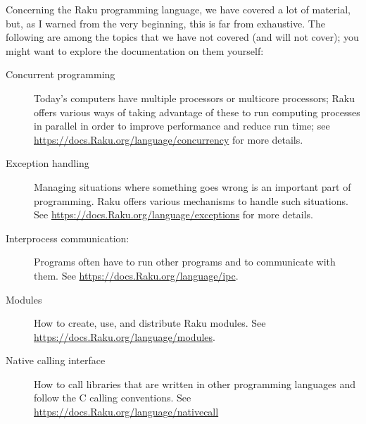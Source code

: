 Concerning the Raku programming language, we have covered a lot of 
material, but, as I warned from the very beginning, 
this is far from exhaustive. The following are among 
the topics that we have not covered (and will not cover); 
you might want to explore the documentation on them 
yourself:

\begin{description}
\item[Concurrent programming] Today's computers have 
multiple processors or multicore processors; Raku 
offers various ways of taking advantage of these to 
run computing processes in parallel in order to 
improve performance and reduce run time; see 
\url{https://docs.Raku.org/language/concurrency} 
for more details.

\item[Exception handling] Managing situations where 
something goes wrong is an important part of 
programming. Raku offers various mechanisms to 
handle such situations. See \url{https://docs.Raku.org/language/exceptions} 
for more details.

\item[Interprocess communication:] Programs often have to 
run other programs and to communicate with them. See 
\url{https://docs.Raku.org/language/ipc}.

\item[Modules] How to create, use, and distribute Raku 
modules. See \url{https://docs.Raku.org/language/modules}.

\item[Native calling interface] How to call libraries 
that are written in other programming languages and 
follow the C calling conventions. 
See \url{https://docs.Raku.org/language/nativecall}

\end{description}